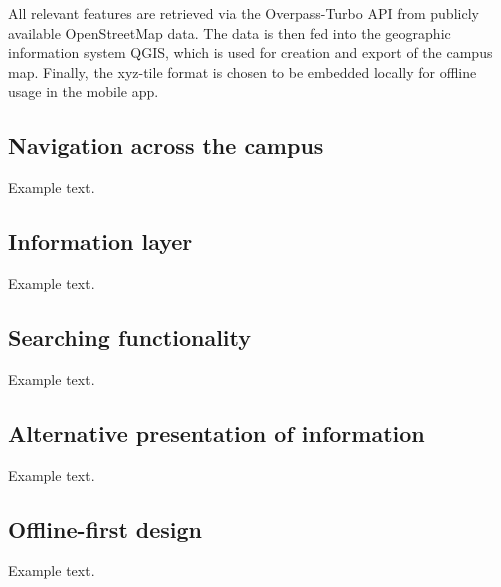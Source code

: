 All relevant features are retrieved via the Overpass-Turbo API from publicly available OpenStreetMap data. The data is then fed into the geographic information system QGIS, which is used for creation and export of the campus map. Finally, the xyz-tile format is chosen to be embedded locally for offline usage in the mobile app.

\subsection{Navigation across the campus}
Example text. 
\subsection{Information layer}
Example text.
\subsection{Searching functionality}
Example text.
\subsection{Alternative presentation of information}
Example text.
\subsection{Offline-first design}
Example text.

